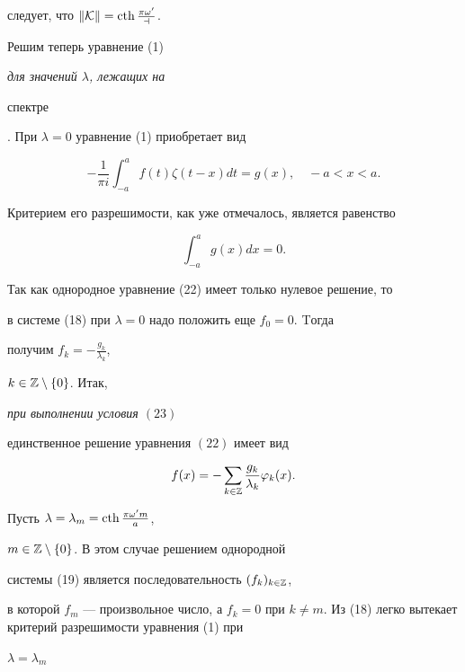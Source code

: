 следует, что $\|\cal{K}\|=


\cth\frac{\pi\omega'}{a}$.








Решим теперь уравнение (1) {\it для значений $\lambda$, лежащих на


спектре}. При $\lambda=0$ уравнение (1) приобретает вид


\begin{equation}


-\dfrac{1}{\pi i}\int^{a}_{-a}f(t)\zeta(t-x)dt=g(x),


\quad -a<x<a.


\end{equation}


Критерием его разрешимости, как уже отмечалось, является равенство


\begin{equation}


\int^{a}_{-a}g(x)dx=0.


\end{equation}


Так как однородное уравнение (22) имеет только нулевое решение, то


в системе (18) при $\lambda=0$ надо положить еще $f_{0}=0$. Tогда


получим $f_{k}=-\frac{g_{k}}{\lambda_{k}}$,


$k\in \Bbb{Z}\setminus\{0\}$. Итак, {\it при выполнении условия $(23)$


единственное решение уравнения $(22)$ имеет вид}


$$


f(x)=-\sum_{k\in\Bbb{Z}}\dfrac{g_{k}}{\lambda_{k}}


\varphi_{k}(x).


$$





Пусть $\lambda=\lambda_{m}=\operatorname{cth}\frac{\pi\omega' m}{a}$,


$m\in \Bbb{Z}\setminus\{0\}$. В этом случае решением однородной


системы (19) является последовательность  $(f_{k})_{k\in \Bbb{Z}}$,


в которой $f_{m}$ --- произвольное число, а $f_{k}=0$ при $k\neq


m$. Из (18) легко вытекает критерий разрешимости уравнения (1) при


$\lambda=\lambda_{m}$



